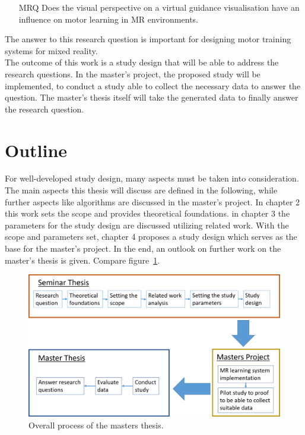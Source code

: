 \begin{itemize}
	\item[MRQ] Does the visual perspective on a virtual guidance visualisation have an influence on motor learning in MR environments.
\end{itemize}
The answer to this research question is important for designing motor training systems for mixed reality.\\
The outcome of this work is a study design that will be able to address the research questions. In the master's project, the proposed study will be implemented, to conduct a study able to collect the necessary data to answer the question. The master's thesis itself will take the generated data to finally answer the research question.


\section{Outline}
For well-developed study design, many aspects must be taken into consideration. The main aspects this thesis will discuss are defined in the following, while further aspects like algorithms are discussed in the master's project. In chapter 2 this work sets the scope and provides theoretical foundations. in chapter 3 the parameters for the study design are discussed utilizing related work. With the scope and parameters set, chapter 4 proposes a study design which serves as the base for the master's project. In the end, an outlook on further work on the master's thesis is given. Compare figure~\ref{fig:overallProcess}.
\begin{figure}[h]
	\centering
	\includegraphics[width=1.0\textwidth]{img/overallProcess_new.png}
	\caption{Overall process of the masters thesis.}
	\label{fig:overallProcess}
\end{figure}\\

